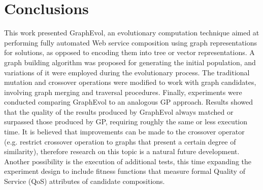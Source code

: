 \documentclass{article}
\begin{document}
\section{Conclusions}\label{conclusions}
This work presented GraphEvol, an evolutionary computation technique aimed at performing fully automated Web service composition using graph representations for solutions, as opposed to encoding them into tree or vector representations. A graph building algorithm was proposed for generating the initial population, and variations of it were employed during the evolutionary process. The traditional mutation and crossover operations were modified to work with graph candidates, involving graph merging and traversal procedures. Finally, experiments were conducted comparing GraphEvol to an analogous GP approach. Results showed that the quality of the results produced by GraphEvol always matched or surpassed those produced by GP, requiring roughly the same or less execution time. It is believed that improvements can be made to the crossover operator (e.g. restrict crossover operation to graphs that present a certain degree of similarity), therefore research on this topic is a natural future development.
Another possibility is the execution of additional tests, this time expanding the experiment design to include fitness functions that measure formal Quality of Service (QoS) attributes \cite{jaeger2007qos} of candidate compositions.

\clearpage


\end{document}

